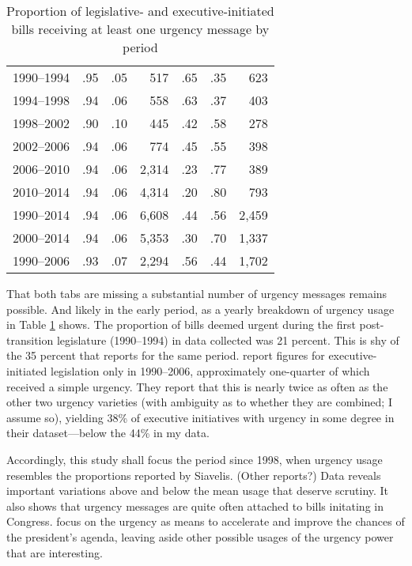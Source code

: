 \documentclass{article}
\begin{document}
\begin{table}
\begin{center}
\begin{tabular}{crrr|rrr}
1990--1994  &.95  & .05 & 517  &.65  &.35 & 623 \\
1994--1998  &.94  & .06 & 558  &.63  &.37 & 403 \\
1998--2002  &.90  & .10 & 445  &.42  &.58 & 278 \\
2002--2006  &.94  & .06 & 774  &.45  &.55 & 398 \\
2006--2010  &.94  & .06 &2,314 &.23  &.77 & 389 \\
2010--2014  &.94  & .06 &4,314 &.20  &.80 & 793 \\ \hline \hline
1990--2014  & .94 & .06 & 6,608 & .44 & .56 & 2,459 \\ 
2000--2014  & .94 & .06 & 5,353 & .30 & .70 & 1,337 \\ 
1990--2006  & .93 & .07 & 2,294 & .56 & .44 & 1,702 \\ 
\end{tabular}
\caption{Proportion of legislative- and executive-initiated bills receiving at least one urgency message by period}\label{T:yearProp}
\end{center}
\end{table}

That both tabs are missing a substantial number of urgency messages remains possible. And likely in the early period, as a yearly breakdown of urgency usage in Table \ref{T:yearProp} shows. The proportion of bills deemed urgent during the first post-transition legislature (1990--1994) in data collected was 21 percent. This is shy of the 35 percent that \citet{siavelis.2002} reports for the same period. \citet[][:404]{aleman.navia.UrgChi.2009} report figures for executive-initiated legislation only in 1990--2006, approximately one-quarter of which received a simple urgency. They report that this is nearly twice as often as the other two urgency varieties (with ambiguity as to whether they are combined; I assume so), yielding 38\% of executive initiatives with urgency in some degree in their dataset---below the 44\% in my data. 

Accordingly, this study shall focus the period since 1998, when urgency usage resembles the proportions reported by Siavelis. (Other reports?) Data reveals important variations above and below the mean usage that deserve scrutiny. It also shows that urgency messages are quite often attached to bills initating in Congress. \citet{aleman.navia.UrgChi.2009} focus on the urgency as means to accelerate and improve the chances of the president's agenda, leaving aside other possible usages of the urgency power that are interesting. 



\end{document}
